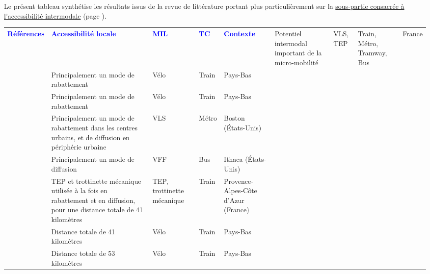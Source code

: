 Le présent tableau synthétise les résultats issus de la revue de littérature portant plus particulièrement sur la \hyperref[Accessibilité intermodale]{sous-partie consacrée à l'accessibilité intermodale} (page \pageref{Accessibilité intermodale}).\par

        \begin{longtable}{p{3cm}p{4cm}p{1.5cm}p{1.8cm}p{2.3cm}}
        \hline
        \textcolor{blue}{\textbf{Références}} & \textcolor{blue}{\textbf{Accessibilité locale}} & \textcolor{blue}{\textbf{MIL}} & \textcolor{blue}{\textbf{TC}} & \textcolor{blue}{\textbf{Contexte}}
        \hline
        \endhead
    \small{\textcite{rabaud_quand_2022}} & \small{Potentiel intermodal important de la \gls{micro-mobilité}} & \small{VLS, TEP} & \small{Train, Métro, Tramway, Bus} & \small{France}\\
    \small{\textcite{rietveld_accessibility_2000}} & \small{Principalement un mode de \gls{rabattement}} & \small{Vélo} & \small{Train} & \small{Pays-Bas}\\
    \small{\textcite{givoni_access_2007}} & \small{Principalement un mode de \gls{rabattement}} & \small{Vélo} & \small{Train} & \small{Pays-Bas}\\
    \small{\textcite{romm_differences_2022}} & \small{Principalement un mode de \gls{rabattement} dans les centres urbains, et de \gls{diffusion} en périphérie urbaine} & \small{VLS} & \small{Métro} & \small{Boston (États-Unis)}\\
    \small{\textcite{qiu_interplay_2021}} & \small{Principalement un mode de \gls{diffusion}} & \small{VFF} & \small{Bus} & \small{Ithaca (États-Unis)}\\
    \small{\textcite{moinse_intermodal_2022}} & \small{TEP et trottinette mécanique utilisée à la fois en \gls{rabattement} et en \gls{diffusion}, pour une distance totale de 41 kilomètres} & \small{TEP, trottinette mécanique} & \small{Train} & \small{Provence-Alpes-Côte d'Azur (France)}\\
    \small{\textcite{shelat_analysing_2018}} & \small{Distance totale de 41 kilomètres} & \small{Vélo} & \small{Train} & \small{Pays-Bas}\\
    \small{\textcite{keijer_how_2000}} & \small{Distance totale de 53 kilomètres} & \small{Vélo} & \small{Train} & \small{Pays-Bas}\\

\end{longtable}

